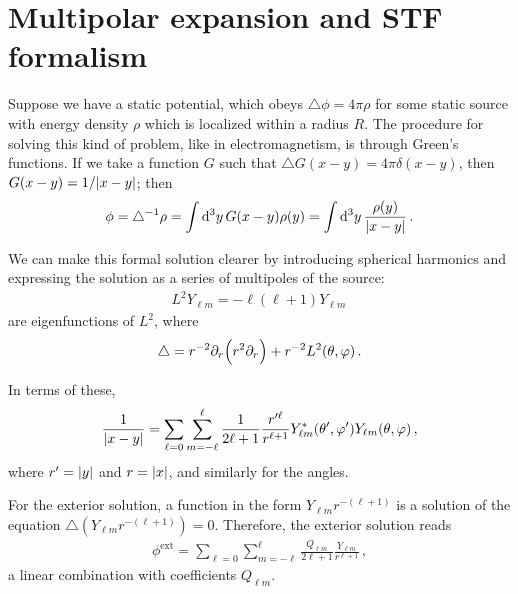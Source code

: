 \documentclass[main.tex]{subfiles}
\begin{document}
\section{Multipolar expansion and STF formalism}


Suppose we have a static potential, which obeys \(\triangle \phi = 4 \pi \rho \) for some static source with energy density \(\rho \) which is localized within a radius \(R\).
The procedure for solving this kind of problem, like in electromagnetism, is through Green's functions. 
If we take a function \(G\) such that \(\triangle G (x-y) = 4\pi \delta (x-y)\), then \(G(x-y) = 1 / \abs{x - y}\); then 
%
\begin{align}
\phi = \triangle^{-1} \rho = \int \dd[3]{y} G(x-y) \rho (y) = \int \dd[3]{y} \frac{\rho (y)}{\abs{x-y}}
\,.
\end{align}

We can make this formal solution clearer by introducing spherical harmonics and expressing the solution as a series of multipoles of the source: 
%
\begin{align}
L^2 Y_{\ell m} = - \ell (\ell + 1) Y_{\ell m}
\,
\end{align}
%
are eigenfunctions of \(L^2\), where 
%
\begin{align}
\triangle = r^{-2} \partial_{r} \qty(r^2 \partial_{r}) + r^{-2} L^2 (\theta , \varphi )
\,.
\end{align}

In terms of these, 
%
\begin{align}
\frac{1}{\abs{x-y}} = \sum _{\ell = 0} \sum _{m=- \ell}^{\ell}
\frac{1}{2 \ell + 1} \frac{r^{\prime \ell}}{r^{\ell + 1}} 
Y^{*}_{\ell m} (\theta ', \varphi ') Y_{\ell m} (\theta , \varphi )
\,,
\end{align}
%
where \(r' = \abs{y}\) and \(r = \abs{x}\), and similarly for the angles.

For the exterior solution, a function in the form \(Y_{\ell m} r^{- (\ell +1)}\) is a solution of the equation \(\triangle (Y_{\ell m} r^{- (\ell +1)}) = 0\). 
Therefore, the exterior solution reads 
%
\begin{align}
\phi^{\text{ext}} = \sum _{\ell= 0} \sum _{m=-\ell}^{\ell} \frac{Q_{\ell m}}{2 \ell + 1} \frac{Y_{\ell m}}{r^{\ell + 1}} 
\,,
\end{align}
%
a linear combination with coefficients \(Q_{\ell m}\). 
\end{document}
